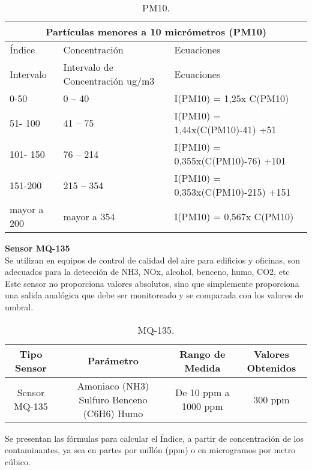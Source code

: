 \documentclass[10pt,a4paper]{article}
\begin{document}
\begin{table}[htb]
\begin{center}
\begin{tabular}{| p{2.2cm}| p{4.2cm} | p{6.2cm}| }
\hline
\multicolumn{3}{|c|}{Partículas menores a 10 micrómetros (PM10)} \\
\hline
Índice & Concentración & Ecuaciones \\
\hline \hline
Intervalo  & Intervalo de Concentración ug/m3 & Ecuaciones  \\ \hline
0-50 & 0 – 40 & I(PM10) = 1,25x C(PM10) \\ \hline
51- 100 & 41 – 75 & I(PM10) = 1,44x(C(PM10)-41) +51 \\ \hline
101- 150 & 76 – 214  & I(PM10) = 0,355x(C(PM10)-76) +101 \\ \hline
151-200 & 215 – 354 & I(PM10) = 0,353x(C(PM10)-215) +151 \\ \hline
mayor a 200	& mayor a 354 & I(PM10) = 0,567x C(PM10) \\ \hline
\end{tabular}
\caption{PM10.}
\end{center}
\end{table}

\textbf{Sensor MQ-135}\\

Se utilizan en equipos de control de calidad del aire para edificios y oficinas, son adecuados para la detección de NH3, NOx, alcohol, benceno, humo, CO2, etc
Este sensor no proporciona valores absolutos, sino que simplemente proporciona una salida analógica que debe ser monitoreado y se comparada con los valores de umbral.


\begin{table}[htb]
\begin{center}
\begin{tabular}{| c | c | c | c |}  
\hline 
\textbf {Tipo Sensor} & \textbf {Parámetro} &  \textbf {Rango de Medida} & \textbf  {Valores Obtenidos} \\  \hline
Sensor MQ-135 & Amoniaco (NH3) Sulfuro Benceno (C6H6) Humo  & De 10 ppm a 1000 ppm & 300 ppm \\ \hline
\end{tabular}
\caption{ MQ-135.}
\end{center}
\end{table}

Se presentan las fórmulas para calcular el Índice, a partir de concentración de los contaminantes, ya sea en partes por millón (ppm) o en microgramos por metro cúbico.\\
\end{document}
